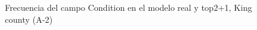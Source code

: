 \begin{figure}[H]
    \centering
    
    \caption{Frecuencia del campo Condition en el modelo real y top2+1, King county (A-2)}
    \label{frecuency-top2+1-condition}
\end{figure}